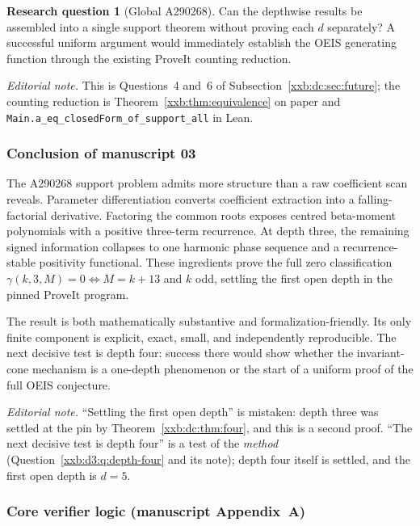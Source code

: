 \documentclass[11pt,a4paper]{article}
\numberwithin{equation}{section}
\theoremstyle{definition}
\newtheorem{question}[theorem]{Research question}
\theoremstyle{remark}
\theoremstyle{plain}
\begin{document}
\begin{question}[Global A290268]
Can the depthwise results be assembled into a single support theorem without
proving each $d$ separately?  A successful uniform argument would immediately
establish the OEIS generating function through the existing ProveIt counting
reduction.
\end{question}

\emph{Editorial note.}  This is Questions~4 and~6 of
Subsection~\ref{xxb:dc:sec:future}; the counting reduction is
Theorem~\ref{xxb:thm:equivalence} on paper and
\texttt{Main.a\_\allowbreak eq\_\allowbreak closedForm\_\allowbreak of\_\allowbreak support\_\allowbreak all}
in Lean.

\subsubsection{Conclusion of manuscript 03}

The A290268 support problem admits more structure than a raw coefficient scan
reveals.  Parameter differentiation converts coefficient extraction into a
falling-factorial derivative.  Factoring the common roots exposes centred
beta-moment polynomials with a positive three-term recurrence.  At depth three,
the remaining signed information collapses to one harmonic phase sequence and
a recurrence-stable positivity functional.  These ingredients prove the full
zero classification $\gamma(k,3,M)=0\iff M=k+13$ and $k$ odd,
settling the first open depth in the pinned ProveIt program.

The result is both mathematically substantive and formalization-friendly.  Its
only finite component is explicit, exact, small, and independently
reproducible.  The next decisive test is depth four: success there would show
whether the invariant-cone mechanism is a one-depth phenomenon or the start of
a uniform proof of the full OEIS conjecture.

\emph{Editorial note.}  ``Settling the first open depth'' is mistaken: depth
three was settled at the pin by Theorem~\ref{xxb:dc:thm:four}, and this is a
second proof.  ``The next decisive test is depth four'' is a test of the
\emph{method} (Question~\ref{xxb:d3:q:depth-four} and its note); depth four
itself is settled, and the first open depth is $d=5$.

\subsubsection{Core verifier logic (manuscript Appendix~A)}
\end{document}
